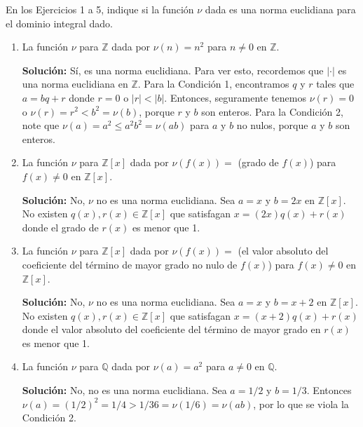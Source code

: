 En los Ejercicios 1 a 5, indique si la función \( \nu \) dada es una norma euclidiana para el dominio integral dado.

\begin{enumerate}
    \item La función \( \nu \) para \( \mathbb{Z} \) dada por \( \nu(n) = n^2 \) para \( n \neq 0 \) en \( \mathbb{Z} \).
    
    \textbf{Solución:} Sí, es una norma euclidiana. Para ver esto, recordemos que \( |\cdot| \) es una norma euclidiana en \( \mathbb{Z} \). Para la Condición 1, encontramos \( q \) y \( r \) tales que \( a = bq + r \) donde \( r = 0 \) o \( |r| < |b| \). Entonces, seguramente tenemos \( \nu(r) = 0 \) o \( \nu(r) = r^2 < b^2 = \nu(b) \), porque \( r \) y \( b \) son enteros. Para la Condición 2, note que \( \nu(a) = a^2 \leq a^2 b^2 = \nu(ab) \) para \( a \) y \( b \) no nulos, porque \( a \) y \( b \) son enteros.
    
    \item La función \( \nu \) para \( \mathbb{Z}[x] \) dada por \( \nu(f(x)) = \) (grado de \( f(x) \)) para \( f(x) \neq 0 \) en \( \mathbb{Z}[x] \).
    
    \textbf{Solución:} No, \( \nu \) no es una norma euclidiana. Sea \( a = x \) y \( b = 2x \) en \( \mathbb{Z}[x] \). No existen \( q(x), r(x) \in \mathbb{Z}[x] \) que satisfagan \( x = (2x)q(x) + r(x) \) donde el grado de \( r(x) \) es menor que 1.
    
    \item La función \( \nu \) para \( \mathbb{Z}[x] \) dada por \( \nu(f(x)) = \) (el valor absoluto del coeficiente del término de mayor grado no nulo de \( f(x) \)) para \( f(x) \neq 0 \) en \( \mathbb{Z}[x] \).
    
    \textbf{Solución:} No, \( \nu \) no es una norma euclidiana. Sea \( a = x \) y \( b = x + 2 \) en \( \mathbb{Z}[x] \). No existen \( q(x), r(x) \in \mathbb{Z}[x] \) que satisfagan \( x = (x + 2)q(x) + r(x) \) donde el valor absoluto del coeficiente del término de mayor grado en \( r(x) \) es menor que 1.
    
    \item La función \( \nu \) para \( \mathbb{Q} \) dada por \( \nu(a) = a^2 \) para \( a \neq 0 \) en \( \mathbb{Q} \).
    
    \textbf{Solución:} No, no es una norma euclidiana. Sea \( a = 1/2 \) y \( b = 1/3 \). Entonces \( \nu(a) = (1/2)^2 = 1/4 > 1/36 = \nu(1/6) = \nu(ab) \), por lo que se viola la Condición 2.
    

\end{enumerate}
